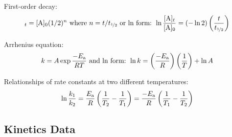 \documentclass[10pt]{article}
\begin{document}

First-order decay:
\begin{equation*}
[\textnormal{A}]_t = [\textnormal{A}]_0 (1/2)^n \textnormal{ where } n = t/t_{\nicefrac{1}{2}}
\textnormal{ or ln form: } 
\ln\frac{[\textnormal{A}]_t}{[\textnormal{A}]_0} = (-\ln 2)\left(\frac{t}{t_{\nicefrac{1}{2}}}\right) 
\end{equation*}

Arrhenius equation:
\begin{equation*}
k = A \exp{\frac{-E_\textnormal{a}}{RT}} \textnormal{ and ln form: } \ln k = \left(\frac{-E_\textnormal{a}}{R}\right)\left(\frac{1}{T}\right) + \ln A
\end{equation*}

Relationships of rate constants at two different temperatures:
\begin{equation*}
\ln \frac{k_1}{k_2} = \frac{E_\textnormal{a}}{R}\left(\frac{1}{T_2} - \frac{1}{T_1}\right) = \frac{-E_\textnormal{a}}{R}\left(\frac{1}{T_1}-\frac{1}{T_2}\right)
\end{equation*}

\subsection{Kinetics Data}
\end{document}

